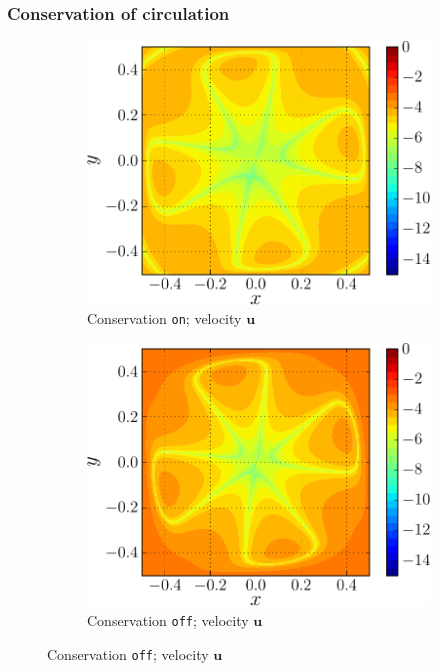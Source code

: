 \subsubsection*{Conservation of circulation}
\label{subsubsec:coc}

	\begin{figure}[h]
     \centering
     \begin{subfigure}[t]{0.45\textwidth}
             \includegraphics[width=\linewidth]{./figures/hybrid/lambOseent2/lambOseen_fully_vErrorFinal_compressed-crop.pdf}
             \caption{Conservation \texttt{on}; velocity $\mathbf{u}$}
             \label{fig:lambOseen_fullyCon_vErrorFinal}
     \end{subfigure}%
     \qquad %
     \begin{subfigure}[t]{0.45\textwidth}
             \includegraphics[width=\linewidth]{./figures/hybrid/lambOseent2/lambOseen_fullyCoff_vErrorFinal_compressed-crop.pdf}
             \caption{Conservation \texttt{off}; velocity $\mathbf{u}$}
             \label{fig:lambOseen_fullyCoff_vErrorFinal}
     \end{subfigure}
     

\end{figure}
